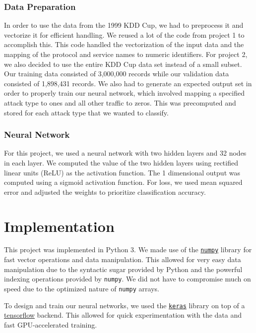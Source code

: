 \documentclass[letterpaper,12pt]{article}
\begin{document}
\subsubsection*{Data Preparation}
In order to use the data from the 1999 KDD Cup, we had to preprocess it and
vectorize it for efficient handling. We reused a lot of the code from project 1
to accomplish this. This code handled the vectorization of the input data and
the mapping of the protocol and service names to numeric identifiers. For
project 2, we also decided to use the entire KDD Cup data set instead of a
small subset. Our training data consisted of 3,000,000 records while our
validation data consisted of 1,898,431 records. We also had to generate an
expected output set in order to properly train our neural network, which
involved mapping a specified attack type to ones and all other traffic to
zeros. This was precomputed and stored for each attack type that we wanted to
classify.

\subsubsection*{Neural Network}
For this project, we used a neural network with two hidden layers and 32 nodes
in each layer. We computed the value of the two hidden layers using rectified
linear units (ReLU) as the activation function. The 1 dimensional output was
computed using a sigmoid activation function. For loss, we used mean squared
error and adjusted the weights to prioritize classification accuracy.

\section*{Implementation}
This project was implemented in Python 3. We made use of the
\href{http://www.numpy.org/}{\texttt{numpy}}
library for fast vector operations and data manipulation. This allowed for
very easy data manipulation due to the syntactic sugar provided by Python and
the powerful indexing operations provided by \texttt{numpy}. We did not have to
compromise much on speed due to the optimized nature of \texttt{numpy} arrays.
\par
To design and train our neural networks, we used the \href{https://keras.io/}{
\texttt{keras}} library on top of a \href{https://www.tensorflow.org/}{
tensorflow} backend. This allowed for quick experimentation with the data and
fast GPU-accelerated training.
\end{document}
